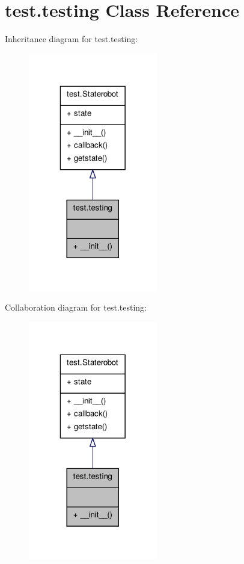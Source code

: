 \hypertarget{classtest_1_1testing}{\section{test.\+testing Class Reference}
\label{classtest_1_1testing}
}


Inheritance diagram for test.\+testing\+:\nopagebreak
\begin{figure}[H]
\begin{center}
\leavevmode
\includegraphics[width=160pt]{classtest_1_1testing__inherit__graph}
\end{center}
\end{figure}


Collaboration diagram for test.\+testing\+:\nopagebreak
\begin{figure}[H]
\begin{center}
\leavevmode
\includegraphics[width=160pt]{classtest_1_1testing__coll__graph}
\end{center}
\end{figure}
